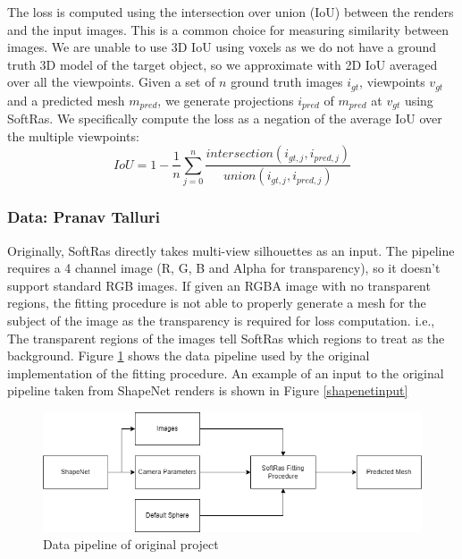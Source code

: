 \documentclass{article}
\begin{document}
The loss is computed using the intersection over union (IoU) between the renders and the input images. This is a common choice for measuring similarity between images. We are unable to use 3D IoU using voxels as we do not have a ground truth 3D model of the target object, so we approximate with 2D IoU averaged over all the viewpoints. Given a set of $n$ ground truth images $i_{gt}$, viewpoints $v_{gt}$ and a predicted mesh $m_{pred}$, we generate projections $i_{pred}$ of $m_{pred}$ at $v_{gt}$ using SoftRas. We specifically compute the loss as a negation of the average IoU over the multiple viewpoints: \[IoU = 1 - \frac{1}{n}\sum_{j=0}^n\frac{intersection(i_{gt, j}, i_{pred, j})}{union(i_{gt, j}, i_{pred, j})}\]

\subsubsection{Data: Pranav Talluri}
Originally, SoftRas directly takes multi-view silhouettes as an input. The pipeline requires a 4 channel image (R, G, B and Alpha for transparency), so it doesn't support standard RGB images. If given an RGBA image with no transparent regions, the fitting procedure is not able to properly generate a mesh for the subject of the image as the transparency is required for loss computation. i.e., The transparent regions of the images tell SoftRas which regions to treat as the background. Figure \ref{shapenetdatapipe} shows the data pipeline used by the original implementation of the fitting procedure. An example of an input to the original pipeline taken from ShapeNet renders is shown in Figure \ref{shapenetinput}

\begin{figure}[h!]
  \centering
  \includegraphics[width=\textwidth]{images/shapenetdatapipe.png}
  \caption{Data pipeline of original project}
  \label{shapenetdatapipe}
\end{figure}
\end{document}
